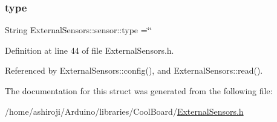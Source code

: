 \subsubsection{\texorpdfstring{type}{type}}
{\footnotesize\ttfamily String External\+Sensors\+::sensor\+::type =\char`\"{}\char`\"{}}



Definition at line 44 of file External\+Sensors.\+h.



Referenced by External\+Sensors\+::config(), and External\+Sensors\+::read().



The documentation for this struct was generated from the following file\+:\begin{DoxyCompactItemize}
\item 
/home/ashiroji/\+Arduino/libraries/\+Cool\+Board/\hyperlink{ExternalSensors_8h}{External\+Sensors.\+h}\end{DoxyCompactItemize}
